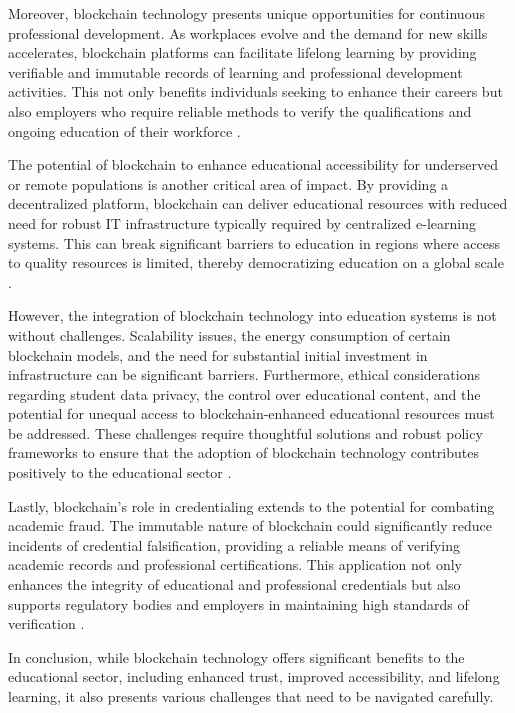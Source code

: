 \documentclass[12pt]{report}
\begin{document}
Moreover, blockchain technology presents unique opportunities for continuous professional development. As workplaces evolve and the demand for new skills accelerates, blockchain platforms can facilitate lifelong learning by providing verifiable and immutable records of learning and professional development activities. This not only benefits individuals seeking to enhance their careers but also employers who require reliable methods to verify the qualifications and ongoing education of their workforce \cite{professionalDevelopmentBlockchain}.

The potential of blockchain to enhance educational accessibility for underserved or remote populations is another critical area of impact. By providing a decentralized platform, blockchain can deliver educational resources with reduced need for robust IT infrastructure typically required by centralized e-learning systems. This can break significant barriers to education in regions where access to quality resources is limited, thereby democratizing education on a global scale \cite{accessibilityBlockchain}.

However, the integration of blockchain technology into education systems is not without challenges. Scalability issues, the energy consumption of certain blockchain models, and the need for substantial initial investment in infrastructure can be significant barriers. Furthermore, ethical considerations regarding student data privacy, the control over educational content, and the potential for unequal access to blockchain-enhanced educational resources must be addressed. These challenges require thoughtful solutions and robust policy frameworks to ensure that the adoption of blockchain technology contributes positively to the educational sector \cite{ethicalBlockchain}.

Lastly, blockchain's role in credentialing extends to the potential for combating academic fraud. The immutable nature of blockchain could significantly reduce incidents of credential falsification, providing a reliable means of verifying academic records and professional certifications. This application not only enhances the integrity of educational and professional credentials but also supports regulatory bodies and employers in maintaining high standards of verification \cite{credentialBlockchain}.

In conclusion, while blockchain technology offers significant benefits to the educational sector, including enhanced trust, improved accessibility, and lifelong learning, it also presents various challenges that need to be navigated carefully.
\end{document}
